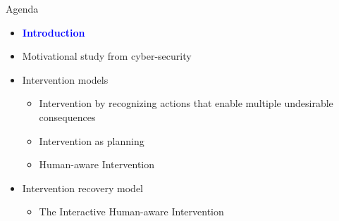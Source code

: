 \begin{frame}{Agenda}
\begin{itemize}
\item \textcolor{blue} {\textbf{Introduction}}
\item Motivational study from cyber-security
\item Intervention models
\begin{itemize}
\item Intervention by recognizing actions that enable multiple undesirable consequences
\item Intervention as planning
\item Human-aware Intervention
\end{itemize}
\item Intervention recovery model
\begin{itemize}
\item The Interactive Human-aware Intervention
\end{itemize}
\end{itemize}

\end{frame}